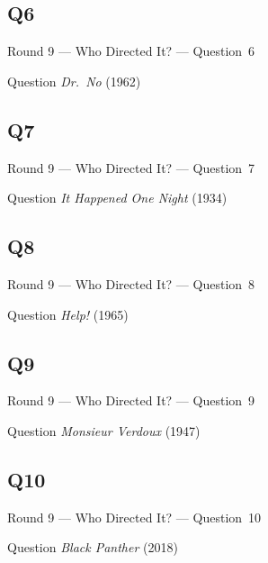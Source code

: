 \documentclass[11pt]{beamer}
\begin{document}
\subsection*{Q6}
\begin{frame}[t]{Round 9 --- Who Directed It? --- \mbox{Question 6}}
\vspace{-0.5em}
\begin{block}{Question}
\emph{Dr.\ No} (1962)
\end{block}
\end{frame}
\subsection*{Q7}
\begin{frame}[t]{Round 9 --- Who Directed It? --- \mbox{Question 7}}
\vspace{-0.5em}
\begin{block}{Question}
\emph{It Happened One Night} (1934)
\end{block}
\end{frame}
\subsection*{Q8}
\begin{frame}[t]{Round 9 --- Who Directed It? --- \mbox{Question 8}}
\vspace{-0.5em}
\begin{block}{Question}
\emph{Help!} (1965)
\end{block}
\end{frame}
\subsection*{Q9}
\begin{frame}[t]{Round 9 --- Who Directed It? --- \mbox{Question 9}}
\vspace{-0.5em}
\begin{block}{Question}
\emph{Monsieur Verdoux} (1947)
\end{block}
\end{frame}
\subsection*{Q10}
\begin{frame}[t]{Round 9 --- Who Directed It? --- \mbox{Question 10}}
\vspace{-0.5em}
\begin{block}{Question}
\emph{Black Panther} (2018)
\end{block}
\end{frame}
\end{document}
